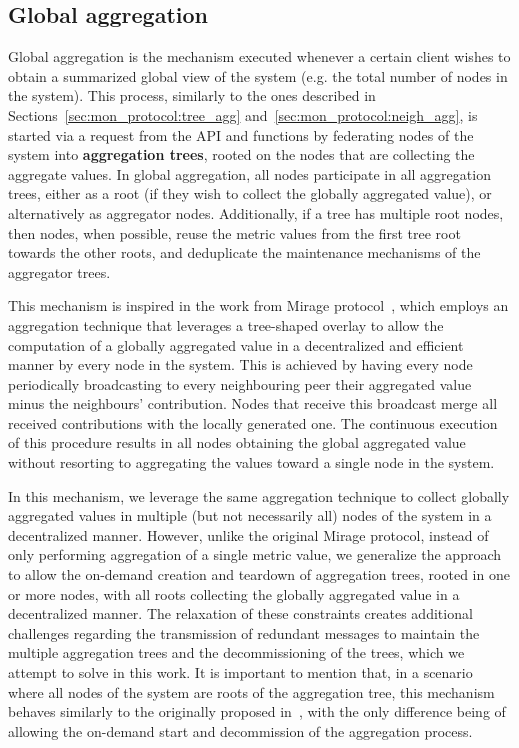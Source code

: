 \subsection{Global aggregation} \label{sec:mon_protocol:global_agg}

Global aggregation is the mechanism executed whenever a certain client wishes to obtain a summarized global view of the system (e.g. the total number of nodes in the system). This process, similarly to the ones described in Sections~\ref{sec:mon_protocol:tree_agg} and~\ref{sec:mon_protocol:neigh_agg}, is started via a request from the API and functions by federating nodes of the system into \textbf{aggregation trees}, rooted on the nodes that are collecting the aggregate values. In global aggregation, all nodes participate in all aggregation trees, either as a root (if they wish to collect the globally aggregated value), or alternatively as aggregator nodes. Additionally, if a tree has multiple root nodes, then nodes, when possible, reuse the metric values from the first tree root towards the other roots, and deduplicate the maintenance mechanisms of the aggregator trees. 

This mechanism is inspired in the work from Mirage protocol~\cite{akosThesis}, which employs an aggregation technique that leverages a tree-shaped overlay to allow the computation of a globally aggregated value in a decentralized and efficient manner by every node in the system. This is achieved by having every node periodically broadcasting to every neighbouring peer their aggregated value minus the neighbours' contribution. Nodes that receive this broadcast merge all received contributions with the locally generated one. The continuous execution of this procedure results in all nodes obtaining the global aggregated value without resorting to aggregating the values toward a single node in the system.


In this mechanism, we leverage the same aggregation technique to collect globally aggregated values in multiple (but not necessarily all) nodes of the system in a decentralized manner. However, unlike the original Mirage protocol, instead of only performing aggregation of a single metric value, we generalize the approach to allow the on-demand creation and teardown of aggregation trees, rooted in one or more nodes, with all roots collecting the globally aggregated value in a decentralized manner. The relaxation of these constraints creates additional challenges regarding the transmission of redundant messages to maintain the multiple aggregation trees and the decommissioning of the trees, which we attempt to solve in this work. It is important to mention that, in a scenario where all nodes of the system are roots of the aggregation tree, this mechanism behaves similarly to the originally proposed in~\cite{akosThesis}, with the only difference being of allowing the on-demand start and decommission of the aggregation process.

